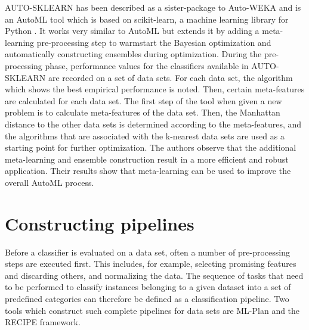 AUTO-SKLEARN has been described as a sister-package to Auto-WEKA and is an AutoML tool which is based on scikit-learn, a machine learning library for Python \cite{feurer2015efficient}. It works very similar to AutoML but extends it by adding a meta-learning pre-processing step to warmstart the Bayesian optimization and automatically constructing ensembles during optimization. During the pre-processing phase, performance values for the classifiers available in AUTO-SKLEARN are recorded on a set of data sets. For each data set, the algorithm which shows the best empirical performance is noted. Then, certain meta-features are calculated for each data set. The first step of the tool when given a new problem is to calculate meta-features of the data set. Then, the Manhattan distance to the other data sets is determined according to the meta-features, and the algorithms that are associated with the k-nearest data sets are used as a starting point for further optimization. The authors observe that the additional meta-learning and ensemble construction result in a more efficient and robust application. Their results show that meta-learning can be used to improve the overall AutoML process.\\

\section{Constructing pipelines}
\label{sec:related:pipelines}
Before a classifier is evaluated on a data set, often a number of pre-processing steps are executed first. This includes, for example, selecting promising features and discarding others, and normalizing the data. The \textquotesingle sequence of tasks that need to be performed to classify instances belonging to a given dataset into a set of predefined categories\textquotesingle \cite{DBLP:conf/eurogp/SaPOP17} can therefore be defined as a classification pipeline. Two tools which construct such complete pipelines for data sets are ML-Plan and the RECIPE framework.

